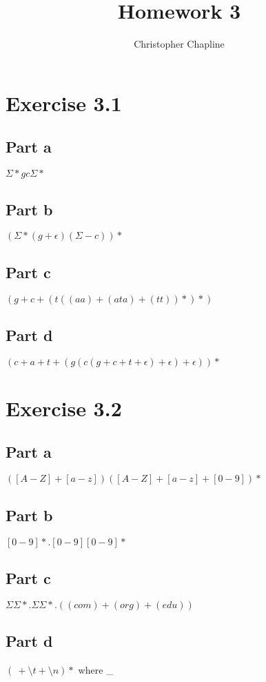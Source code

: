 \documentclass{article}%
\begin{document}
\title{Homework 3}


\author{Christopher Chapline}
\maketitle

\section{Exercise 3.1}

\subsection{Part a}
$\Sigma*gc\Sigma*$

\subsection{Part b}
$(\Sigma*(g + \epsilon)(\Sigma - c))*$

\subsection{Part c}
$(g + c + (t((aa) + (ata) + (tt))*)*)$

\subsection{Part d}
$(c + a + t + (g(c(g + c + t + \epsilon) + \epsilon) + \epsilon))*$

\section{Exercise 3.2}

\subsection{Part a}
$([A-Z] + [a-z])([A-Z] + [a-z] + [0-9])*$

\subsection{Part b}
$[0-9]*.[0-9][0-9]*$

\subsection{Part c}
$\Sigma \Sigma*.\Sigma \Sigma*.((com) + (org) + (edu))$

\subsection{Part d}
$({\ } + \setminus t + \setminus n)*$ where {\_}
\end{document}
